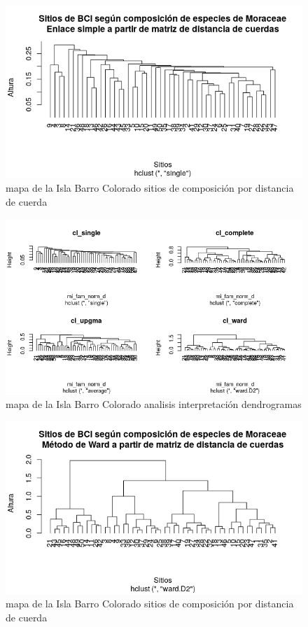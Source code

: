 \documentclass[11pt,]{article}
\begin{document}
\begin{figure}
\centering
\includegraphics[width=1.00000\textwidth]{sitios_composicion_distancia_cuerdas.png}
\caption{mapa de la Isla Barro Colorado sitios de composición por
distancia de cuerda \label{fig:bci_map}}
\end{figure}

\begin{figure}
\centering
\includegraphics[width=1.00000\textwidth]{analisis_interpretacion_dendrogramas.png}
\caption{mapa de la Isla Barro Colorado analisis interpretación
dendrogramas \label{fig:bci_map}}
\end{figure}

\begin{figure}
\centering
\includegraphics[width=1.00000\textwidth]{sitios_metodo_ward.png}
\caption{mapa de la Isla Barro Colorado sitios de composición por
distancia de cuerda \label{fig:bci_map}}
\end{figure}
\end{document}
